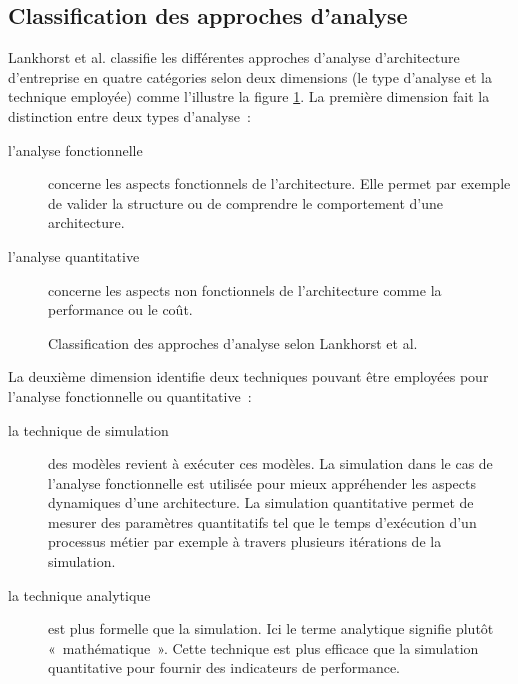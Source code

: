 \subsection{Classification des approches d'analyse}

Lankhorst et al. \cite{lankhorst2013enterprise} classifie les différentes
approches d'analyse d'architecture d'entreprise en quatre catégories selon deux
dimensions (le type d'analyse et la technique employée) comme l'illustre la
figure \ref{fig:classLankhorst}. La première dimension fait la distinction
entre deux types d'analyse~:

\begin{description}
    \item[l'analyse fonctionnelle] concerne les aspects fonctionnels de
    l'architecture. Elle permet par exemple de valider la structure ou de
    comprendre le comportement d'une architecture.

    \item[l'analyse quantitative] concerne les aspects non fonctionnels de
    l'architecture comme la performance ou le coût.
\end{description}

\begin{figure}[!ht]
    \begin{center}
        
    \end{center}
    \caption{Classification des approches d'analyse selon Lankhorst et al. 
    \protect\cite{lankhorst2013enterprise}}
    \label{fig:classLankhorst}
\end{figure}

La deuxième dimension identifie deux techniques pouvant être employées pour 
l'analyse fonctionnelle ou quantitative~:

\begin{description}

    \item[la technique de simulation] des modèles revient à exécuter ces
    modèles. La simulation dans le cas de l'analyse fonctionnelle est utilisée
    pour mieux appréhender les aspects dynamiques d'une architecture. La
    simulation quantitative permet de mesurer des paramètres quantitatifs tel
    que le temps d'exécution d'un processus métier par exemple à travers
    plusieurs itérations de la simulation. 

    \item[la technique analytique] est plus formelle que la simulation.  Ici le
    terme analytique signifie plutôt «~mathématique~». Cette technique est plus
    efficace que la simulation quantitative pour fournir des indicateurs de
    performance. 

\end{description}
	
